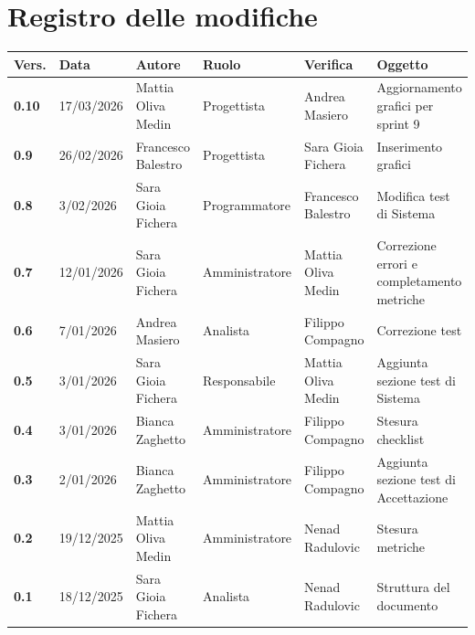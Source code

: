 \documentclass[a4paper,12pt]{article}
\begin{document}
    

    \section*{Registro delle modifiche} {
        \begin{table}[h!]
                \begin{tabularx}{\textwidth}{|l|l|l|l|L|L|}
                \hline
                \textbf{Vers.} & \textbf{Data} & \textbf{Autore} & \textbf{Ruolo} & \textbf{Verifica} & \textbf{Oggetto} \\
                \hline
                \textbf{0.10} & 17/03/2026 & Mattia Oliva Medin & Progettista & Andrea Masiero & Aggiornamento grafici per sprint 9\\
                \hline
                \textbf{0.9} & 26/02/2026 & Francesco Balestro & Progettista & Sara Gioia Fichera & Inserimento grafici\\
                \hline
                \textbf{0.8} & 3/02/2026 & Sara Gioia Fichera & Programmatore & Francesco Balestro & Modifica test di Sistema\\
                \hline
                \textbf{0.7} & 12/01/2026 & Sara Gioia Fichera & Amministratore & Mattia Oliva Medin & Correzione errori e completamento metriche \\
                \hline
                \textbf{0.6} & 7/01/2026 & Andrea Masiero & Analista & Filippo Compagno & Correzione test \\
                \hline
                \textbf{0.5} & 3/01/2026 & Sara Gioia Fichera & Responsabile & Mattia Oliva Medin & Aggiunta sezione test di Sistema \\
                \hline
                \textbf{0.4} & 3/01/2026 & Bianca Zaghetto & Amministratore & Filippo Compagno & Stesura checklist \\
                \hline
                \textbf{0.3} & 2/01/2026 & Bianca Zaghetto & Amministratore & Filippo Compagno & Aggiunta sezione test di Accettazione \\
                \hline
                \textbf{0.2} & 19/12/2025 & Mattia Oliva Medin & Amministratore & Nenad Radulovic & Stesura metriche\\
                \hline
                \textbf{0.1} & 18/12/2025 & Sara Gioia Fichera & Analista & Nenad Radulovic & Struttura del documento \\
                \hline
            \end{tabularx}
        \end{table}
    }
    \newpage
    
\end{document}
